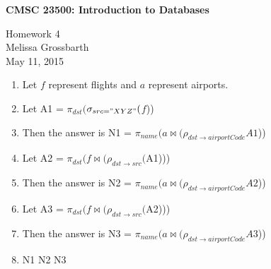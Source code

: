 \documentclass{article}[12pt]
\newcommand{\assignment}{Homework 4}
\newcommand{\whoami}{Melissa Grossbarth}
\newcommand{\assignmentdate}{May 11, 2015}
\newcommand{\rel}[1]{\ensuremath{#1}}
\newcommand{\nj}[2]{\ensuremath{#1 \bowtie #2}}
\newcommand{\sel}[2]{\ensuremath{\sigma_{#1} #2}}
\newcommand{\proj}[2]{\ensuremath{\pi_{#1} #2}}
\newcommand{\ren}[2]{\ensuremath{\rho_{#1} #2}}
\begin{document}
{\large \bf CMSC 23500: Introduction to Databases}

\assignment \\
\whoami \\
\assignmentdate

\hrulefill


\begin{enumerate}

\item[]Let \rel{f} represent flights and \rel{a} represent airports.

\item Let A1 = \proj{dst}({\sel{src="XYZ"}(\rel{f})})

\item[] Then the answer is N1 = \proj{name}(\nj{\rel{a}}({\ren{dst \rightarrow airportCode}{A1}}))

\item Let A2 = \proj{dst}(\nj{\rel{f}}({\ren{dst \rightarrow src} (A1)}))

\item[] Then the answer is N2 = \proj{name}(\nj{\rel{a}}({\ren{dst \rightarrow airportCode}{A2}}))

\item Let A3 = \proj{dst}(\nj{\rel{f}}({\ren{dst \rightarrow src} (A2)}))

\item[] Then the answer is N3 = \proj{name}(\nj{\rel{a}}({\ren{dst \rightarrow airportCode}{A3}}))

\item N1 \cup N2 \cup N3

\end{enumerate}
\end{document}
